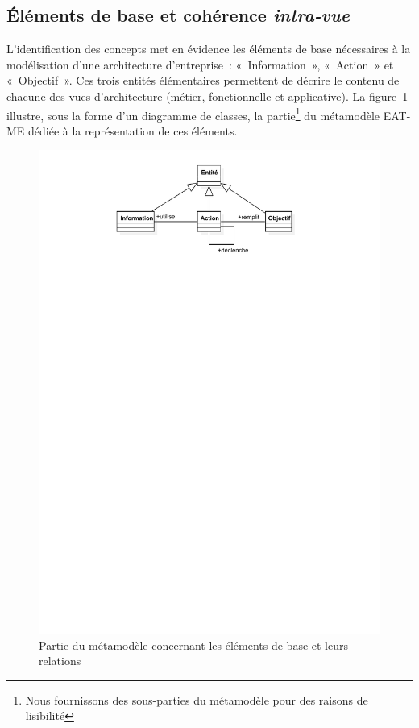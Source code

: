     \subsection{Éléments de base et cohérence \emph{intra-vue}}
    \label{sec:intravue}

    L'identification des concepts met en évidence les éléments de base nécessaires à la modélisation d'une
    architecture d'entreprise~: «~Information~», «~Action~» et «~Objectif~». Ces trois entités élémentaires permettent de décrire
    le contenu de chacune des vues d’architecture (métier, fonctionnelle et applicative).
    La figure~\ref{fig:core_concepts} illustre, sous la forme d'un diagramme de 
    classes, la partie\footnote{Nous fournissons des sous-parties du métamodèle pour des raisons de
    lisibilité} du métamodèle EAT-ME dédiée à la représentation de ces éléments.

    \begin{figure}[!ht]
    \begin{center}
    \includegraphics[trim= 0cm 23cm 0cm 0cm, width=1\textwidth]{figures/4_demarche/core_concepts.pdf}
    \end{center}
    \caption{Partie du métamodèle concernant les éléments de base et leurs relations} 
    \label{fig:core_concepts}
    \end{figure}

